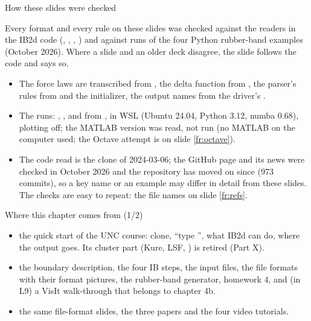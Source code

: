 \documentclass[aspectratio=169,11pt]{beamer}
\begin{document}
\begin{frame}{How these slides were checked}
\label{fr:checked}
\begin{punchbox}
\small Every format and every rule on these slides was checked against the readers in the IB2d code (, , , ) and against runs of the four Python rubber-band examples (October 2026). Where a slide and an older deck disagree, the slide follows the code and says so.
\end{punchbox}
\footnotesize
\begin{itemize}
  \item The force laws are transcribed from , the delta function from , the parser's rules from  and the initializer, the output names from the driver's .
  \item The runs: , ,  and  from , in WSL (Ubuntu 24.04, Python 3.12, numba 0.68), plotting off; the MATLAB version was read, not run (no MATLAB on the computer used; the Octave attempt is on slide \ref{fr:octave}).
  \item The code read is the clone of 2024-03-06; the GitHub page and its news were checked in October 2026 and the repository has moved on since (973 commits), so a key name or an example may differ in detail from these slides. The checks are easy to repeat: the file names on slide \ref{fr:refs}.
\end{itemize}
\end{frame}

\begin{frame}{Where this chapter comes from (1/2)}
\label{fr:sources}
\small
\begin{itemize}
  \item {} the quick start of the UNC course: clone, ``type '', what IB2d can do, where the output goes. Its cluster part (Kure, LSF, ) is retired (Part X).
  \item {} the boundary description, the four IB steps, the input files, the file formats with their format pictures, the rubber-band generator, homework 4, and (in L9) a VisIt walk-through that belongs to chapter 4b.
  \item {} the same file-format slides, the three papers and the four video tutorials.
\end{itemize}
\end{frame}
\end{document}
